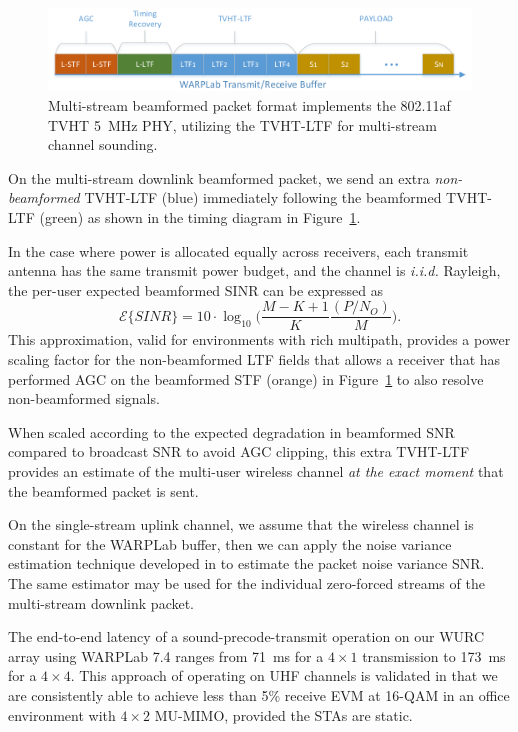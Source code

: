 \begin{figure}[ht] 
\centering
\includegraphics[width=1\linewidth]{./figs/packet_format.pdf}
\caption{Multi-stream beamformed packet format implements the 802.11af TVHT 5~MHz PHY, utilizing the TVHT-LTF for multi-stream channel sounding.}
\label{fig:packet_format}
\end{figure}

	On the multi-stream downlink beamformed packet, we send an extra \textit{non-beamformed} TVHT-LTF (blue) immediately following the beamformed TVHT-LTF (green) as shown in the timing diagram in Figure~\ref{fig:packet_format}.
	
		In the case where power is allocated equally across receivers, each transmit antenna has the same transmit power budget, and the channel is \emph{i.i.d.} Rayleigh, the per-user expected beamformed \ac{SINR} can be expressed \cite{anandpuma} as
\begin{equation} \label{eq_expected_bf_sinr}
\mathcal{E}\{ SINR\} = 10\cdot \log_{10}\bigg( \frac{M-K+1}{K}\frac{(P/N_O)}{M} \bigg).
\end{equation}
	This approximation, valid for environments with rich multipath, provides a power scaling factor for the non-beamformed \ac{LTF} fields that allows a receiver that has performed \ac{AGC} on the beamformed \ac{STF} (orange) in Figure~\ref{fig:packet_format} to also resolve non-beamformed signals.
	
	When scaled according to the expected degradation in beamformed \ac{SNR} compared to broadcast \ac{SNR} \cite{anandpuma} to avoid \ac{AGC} clipping, this extra TVHT-LTF provides an estimate of the multi-user wireless channel \emph{at the exact moment} that the beamformed packet is sent.

	On the single-stream uplink channel, we assume that the wireless channel is constant for the WARPLab buffer, then we can apply the noise variance estimation technique developed in \cite{ren2009snr} to estimate the packet noise variance \ac{SNR}. 
	The same estimator may be used for the individual zero-forced streams of the multi-stream downlink packet.
	
	The end-to-end latency of a sound-precode-transmit operation on our \ac{WURC} array using WARPLab 7.4 ranges from 71~ms for a $4\times 1$ transmission to 173~ms for a $4\times 4$.
	This approach of operating on UHF channels is validated in that we are consistently able to achieve less than 5\% receive \ac{EVM} at 16-QAM in an office environment with $4\times 2$ \ac{MU-MIMO}, provided the \acp{STA} are static.
	
